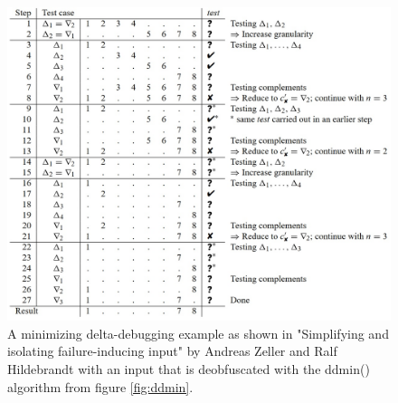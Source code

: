 \begin{figure}
	\centering
	\includegraphics[width=1.0\textwidth]{images/ddminExampleFromPaper5}
	\caption{A minimizing delta-debugging example as shown in "Simplifying and isolating failure-inducing input" by Andreas Zeller and Ralf Hildebrandt \cite{5zeller2002simplifyingIsolatingFailure-inducing} with an input that is deobfuscated with the ddmin() algorithm from figure \ref{fig:ddmin}.}
	\label{fig:ddminExample}
\end{figure}

